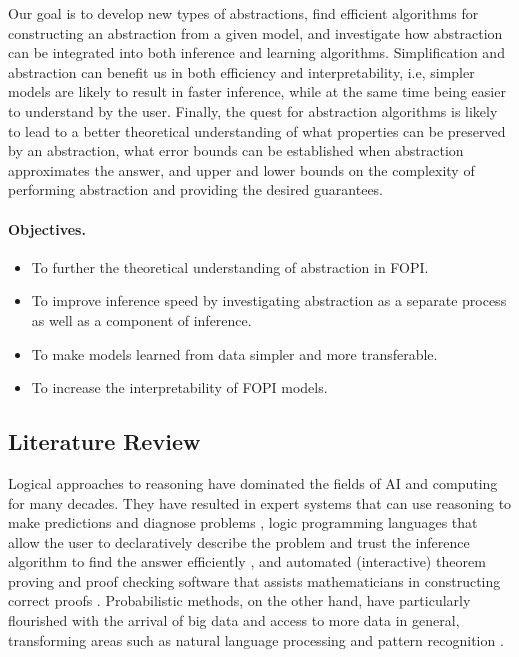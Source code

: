 \documentclass{article}
\begin{document}
Our goal is to develop new types of abstractions, find efficient
algorithms for constructing an abstraction from a given model, and investigate
how abstraction can be integrated into both inference and learning algorithms.
Simplification and abstraction can benefit us in both efficiency and
interpretability, i.e, simpler models are likely to result in faster inference,
while at the same time being easier to understand by the user. Finally, the
quest for abstraction algorithms is likely to lead to a better theoretical
understanding of what properties can be preserved by an abstraction, what error
bounds can be established when abstraction approximates the answer, and upper
and lower bounds on the complexity of performing abstraction and providing the
desired guarantees.

\paragraph{Objectives.}
\begin{itemize}
\item To further the theoretical understanding of abstraction in FOPI.
\item To improve inference speed by investigating abstraction as a separate
  process as well as a component of inference.
\item To make models learned from data simpler and more transferable.
\item To increase the interpretability of FOPI models.
\end{itemize}

\subsection{Literature Review}

Logical approaches to reasoning have dominated the fields of AI and computing
for many decades. They have resulted in expert systems that can use reasoning to
make predictions and diagnose problems \cite{hayes1983building}, logic
programming languages that allow the user to declaratively describe the problem
and trust the inference algorithm to find the answer efficiently
\cite{DBLP:books/sp/Lloyd87}, and automated (interactive) theorem proving and
proof checking software that assists mathematicians in constructing correct
proofs \cite{DBLP:books/el/RobinsonV01}. Probabilistic methods, on the other
hand, have particularly flourished with the arrival of big data and access to
more data in general, transforming areas such as natural language processing and
pattern recognition \cite{DBLP:series/sci/BrazAR08}.
\end{document}
